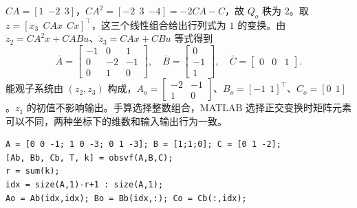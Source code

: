 
\sol $CA=[1\ \ {-2}\ \ 3]$，$CA^2=[-2\ \ 3\ \ {-4}]=-2CA-C$，故 $Q_o$ 秩为 $2$。取 $z=[x_3\ \ CAx\ \ Cx]^\top$，这三个线性组合给出行列式为 $1$ 的变换。由 $\dot z_2=CA^2x+CABu$、$\dot z_3=CAx+CBu$ 等式得到
\[
    \bar A=\begin{bmatrix}-1&0&1\\0&-2&-1\\0&1&0\end{bmatrix},\quad
    \bar B=\begin{bmatrix}0\\-1\\1\end{bmatrix},\quad
    \bar C=\begin{bmatrix}0&0&1\end{bmatrix}.
\]
能观子系统由 $(z_2,z_3)$ 构成，$A_o=\begin{bmatrix}-2&-1\\1&0\end{bmatrix}$、$B_o=[-1\ \ 1]^\top$、$C_o=[0\ \ 1]$。$z_1$ 的初值不影响输出。手算选择整数组合，MATLAB 选择正交变换时矩阵元素可以不同，两种坐标下的维数和输入输出行为一致。
\begin{verbatim}
A = [0 0 -1; 1 0 -3; 0 1 -3]; B = [1;1;0]; C = [0 1 -2];
[Ab, Bb, Cb, T, k] = obsvf(A,B,C);
r = sum(k);
idx = size(A,1)-r+1 : size(A,1);
Ao = Ab(idx,idx); Bo = Bb(idx,:); Co = Cb(:,idx);
\end{verbatim}
